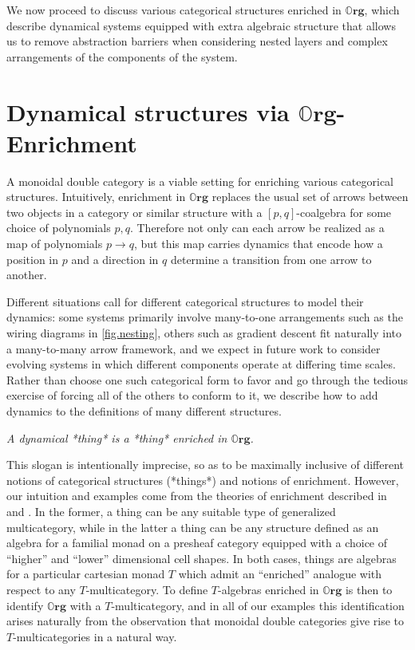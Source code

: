 \documentclass[11pt, one side, article]{memoir}
\theoremstyle{definition}
\theoremstyle{plain}
\newcommand{\Cat}[1]{\mathbf{#1}}%
\newcommand{\0}{\textsf{0}}
\newcommand{\1}{\tn{\textsf{1}}}
\newcommand{\slogan}[1]{\begin{center}\textit{#1}\end{center}}
\newcommand{\org}{{\mathbb{O}\Cat{rg}}}
\begin{document}
We now proceed to discuss various categorical structures enriched in $\org$, which describe dynamical systems equipped with extra algebraic structure that allows us to remove abstraction barriers when considering nested layers and complex arrangements of the components of the system.


\chapter{Dynamical structures via $\org$-Enrichment}


A monoidal double category is a viable setting for enriching various categorical structures. Intuitively, enrichment in $\org$ replaces the usual set of arrows between two objects in a category or similar structure with a $[p,q]$-coalgebra for some choice of polynomials $p,q$. Therefore not only can each arrow be realized as a map of polynomials $p \to q$, but this map carries dynamics that encode how a position in $p$ and a direction in $q$ determine a transition from one arrow to another.

Different situations call for different categorical structures to model their dynamics: some systems primarily involve many-to-one arrangements such as the wiring diagrams in \cref{fig.nesting}, others such as gradient descent fit naturally into a many-to-many arrow framework, and we expect in future work to consider evolving systems in which different components operate at differing time scales. Rather than choose one such categorical form to favor and go through the tedious exercise of forcing all of the others to conform to it, we describe how to add dynamics to the definitions of many different structures.

\slogan{A dynamical *thing* is a *thing* enriched in $\org$.}

This slogan is intentionally imprecise, so as to be maximally inclusive of different notions of categorical structures  (*things*) and notions of enrichment. However, our intuition and examples come from the theories of enrichment described in \cite{leinster1999generalized} and \cite{shapiro2022enrichment}. In the former, a thing can be any suitable type of generalized multicategory, while in the latter a thing can be any structure defined as an algebra for a familial monad on a presheaf category equipped with a choice of ``higher'' and ``lower'' dimensional cell shapes. In both cases, things are algebras for a particular cartesian monad $T$ which admit an ``enriched'' analogue with respect to any $T$-multicategory. To define $T$-algebras enriched in $\org$ is then to identify $\org$ with a $T$-multicategory, and in all of our examples this identification arises naturally from the observation that monoidal double categories give rise to $T$-multicategories in a natural way.
\end{document}
